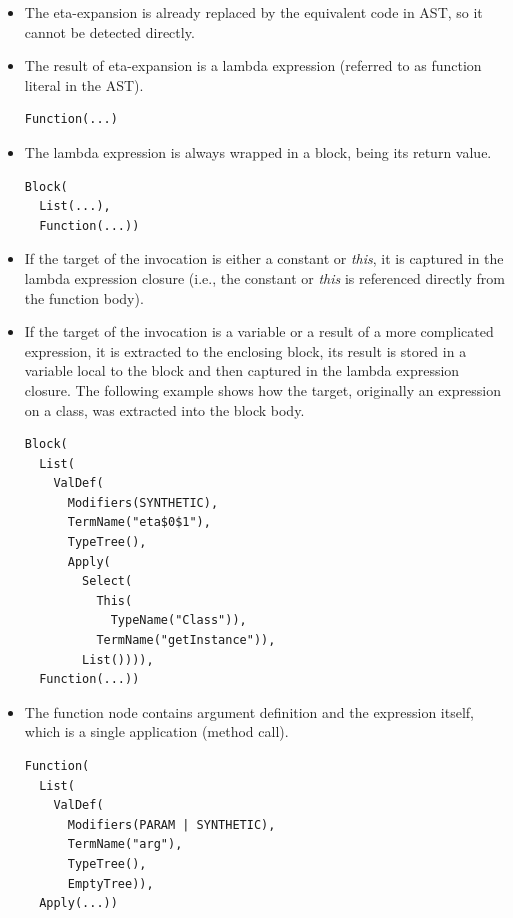 \begin{itemize}
	\item The eta-expansion is already replaced by the equivalent code in AST, so it cannot be detected directly.
	\item The result of eta-expansion is a lambda expression (referred to as function literal in the AST).
\lstset{style=Dump}
\begin{lstlisting}
Function(...)
\end{lstlisting}
	\item The lambda expression is always wrapped in a block, being its return value.
	
\lstset{style=Dump}
\begin{lstlisting}
Block(
  List(...), 
  Function(...))
\end{lstlisting}	
	
	\item If the target of the invocation is either a constant or \textit{this}, it is captured in the lambda expression closure (i.e., the constant or \textit{this} is referenced directly from the function body).
	
	\item If the target of the invocation is a variable or a result of a more complicated expression, it is extracted to the enclosing block, its result is stored in a variable local to the block and then captured in the lambda expression closure. The following example shows how the target, originally an expression  on a  class, was extracted into the block body.
	
\lstset{style=Dump}
\begin{lstlisting}
Block(
  List(
    ValDef(
      Modifiers(SYNTHETIC), 
      TermName("eta$0$1"), 
      TypeTree(), 
      Apply(
        Select(
          This(
            TypeName("Class")), 
          TermName("getInstance")), 
        List()))), 
  Function(...))
\end{lstlisting}

	\item The function node contains argument definition and the expression itself, which is a single application (method call).

\lstset{style=Dump}
\begin{lstlisting}
Function(
  List(
    ValDef(
      Modifiers(PARAM | SYNTHETIC), 
      TermName("arg"), 
      TypeTree(), 
      EmptyTree)), 
  Apply(...))
\end{lstlisting}
\end{itemize}

